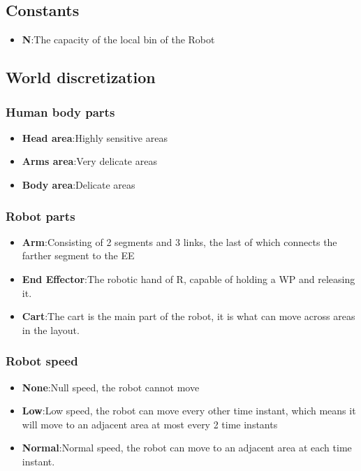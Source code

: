 \documentclass[a4paper]{article}
\begin{document}
\subsection{Constants}
\begin{itemize}
    \item \textbf{N}:\@ The capacity of the local bin of the Robot
\end{itemize}
\subsection{World discretization}

\subsubsection{Human body parts}
\begin{itemize}
    \item \textbf{Head area}:\@ Highly sensitive areas
    \item \textbf{Arms area}:\@ Very delicate areas
    \item \textbf{Body area}:\@ Delicate areas
\end{itemize}

\subsubsection{Robot parts}
\begin{itemize}
    \item \textbf{Arm}:\@ Consisting of 2 segments and 3 links, the last of which connects the farther segment to the EE
    \item \textbf{End Effector}:\@ The robotic hand of R, capable of holding a WP and releasing it.
    \item \textbf{Cart}:\@ The cart is the main part of the robot, it is what can move across areas in the layout.
\end{itemize}

\subsubsection{Robot speed}
\begin{itemize}
    \item \textbf{None}:\@ Null speed, the robot cannot move
    \item \textbf{Low}:\@ Low speed, the robot can move every other time instant, which means it will move to an adjacent area at most every 2 time instants
    \item \textbf{Normal}:\@ Normal speed, the robot can move to an adjacent area at each time instant.
\end{itemize}
\end{document}
